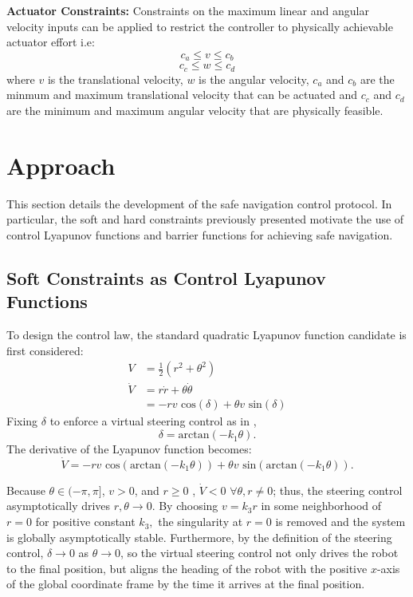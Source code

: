 \documentclass[conference]{IEEEtran}
\begin{document}
\textbf{Actuator Constraints:} Constraints on the maximum linear and angular velocity inputs can be applied to restrict the controller to physically achievable actuator effort i.e:
\begin{equation} c_a \leq v  \leq c_b \end{equation}
\begin{equation} c_c \leq w \leq c_d \end{equation}
where $v$ is the translational velocity, $w$ is the angular velocity, $c_a$ and $c_b$ are the minmum and maximum translational velocity that can be actuated and $c_c$ and $c_d$ are the minimum and maximum angular velocity that are physically feasible.
\fi

\section{Approach}
This section details the development of the safe navigation control protocol. In particular, the soft and hard constraints previously presented motivate the use of control Lyapunov functions and barrier functions for achieving safe navigation.

\subsection{Soft Constraints as Control Lyapunov Functions}
To design the control law, the standard quadratic Lyapunov function candidate is first considered:
\begin{align}
V&=\frac{1}{2}(r^2+\theta^2)\\
\dot{V}&=r \dot{r}+\theta \dot{\theta}\\
&=-r v \text{ cos}(\delta) + \theta v \text{ sin}(\delta)
\end{align}
Fixing $\delta$ to enforce a virtual steering control as in \cite{park2011}, 
\begin{equation} 
\delta = \text{arctan}(-k_1\theta). \end{equation}
The derivative of the Lyapunov function becomes:
\begin{equation}
\dot{V}=-r v \text{ cos}(\text{arctan}(-k_1\theta)) + \theta v \text{ sin}(\text{arctan}(-k_1\theta)).
\end{equation} 

Because $\theta\in (-\pi,\pi]$, $v>0$, and $r\geq 0$ , $\dot{V}<0$ $\forall \theta,r\neq0$; thus, the steering control asymptotically drives $r,\theta\to 0$. By choosing $v=k_3 r$ in some neighborhood of $r=0$ for positive constant $k_3,$ the singularity at $r=0$ is removed and the system is globally asymptotically stable. Furthermore, by the definition of the steering control, $\delta\to 0$ as $\theta \to 0$, so the virtual steering control not only drives the robot to the final position, but aligns the heading of the robot with the positive $x$-axis of the global coordinate frame by the time it arrives at the final position. 
\end{document}

